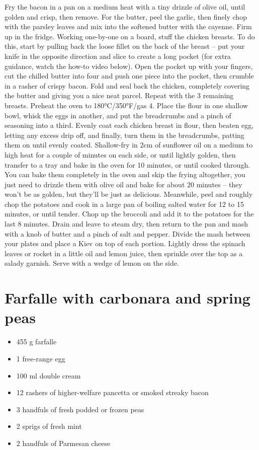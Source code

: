 \documentclass[
]{book}
\providecommand{\tightlist}{%
  \setlength{\itemsep}{0pt}\setlength{\parskip}{0pt}}
\begin{document}
Fry the bacon in a pan on a medium heat with a tiny drizzle of olive oil, until golden and crisp, then remove.
For the butter, peel the garlic, then finely chop with the parsley leaves and mix into the softened butter with the cayenne. Firm up in the fridge.
Working one-by-one on a board, stuff the chicken breasts. To do this, start by pulling back the loose fillet on the back of the breast -- put your knife in the opposite direction and slice to create a long pocket (for extra guidance, watch the how-to video below).
Open the pocket up with your fingers, cut the chilled butter into four and push one piece into the pocket, then crumble in a rasher of crispy bacon. Fold and seal back the chicken, completely covering the butter and giving you a nice neat parcel. Repeat with the 3 remaining breasts.
Preheat the oven to 180°C/350°F/gas 4.
Place the flour in one shallow bowl, whisk the eggs in another, and put the breadcrumbs and a pinch of seasoning into a third. Evenly coat each chicken breast in flour, then beaten egg, letting any excess drip off, and finally, turn them in the breadcrumbs, patting them on until evenly coated.
Shallow-fry in 2cm of sunflower oil on a medium to high heat for a couple of minutes on each side, or until lightly golden, then transfer to a tray and bake in the oven for 10 minutes, or until cooked through. You can bake them completely in the oven and skip the frying altogether, you just need to drizzle them with olive oil and bake for about 20 minutes -- they won't be as golden, but they'll be just as delicious.
Meanwhile, peel and roughly chop the potatoes and cook in a large pan of boiling salted water for 12 to 15 minutes, or until tender.
Chop up the broccoli and add it to the potatoes for the last 8 minutes. Drain and leave to steam dry, then return to the pan and mash with a knob of butter and a pinch of salt and pepper.
Divide the mash between your plates and place a Kiev on top of each portion. Lightly dress the spinach leaves or rocket in a little oil and lemon juice, then sprinkle over the top as a salady garnish. Serve with a wedge of lemon on the side.

\hypertarget{farfalle-with-carbonara-and-spring-peas}{%
\section{Farfalle with carbonara and spring peas}\label{farfalle-with-carbonara-and-spring-peas}}

\begin{itemize}
\tightlist
\item
  455 g farfalle
\item
  1 free-range egg
\item
  100 ml double cream
\item
  12 rashers of higher-welfare pancetta or smoked streaky bacon
\item
  3 handfuls of fresh podded or frozen peas
\item
  2 sprigs of fresh mint
\item
  2 handfuls of Parmesan cheese
\end{itemize}
\end{document}

